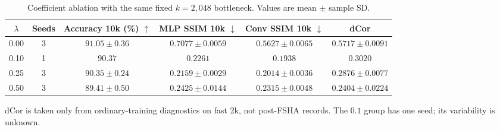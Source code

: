 \begin{table}[t]
\centering
\caption{Coefficient ablation with the same fixed $k=2{,}048$ bottleneck. Values are mean $\pm$ sample SD.}
\label{tab:ablation}
\footnotesize
\setlength{\tabcolsep}{4pt}
\begin{tabular}{@{}cccccc@{}}
\toprule
$\lambda$ & Seeds & Accuracy 10k (\%) $\uparrow$ & MLP SSIM 10k $\downarrow$ & Conv SSIM 10k $\downarrow$ & dCor \\
\midrule
0.00 & 3 & $91.05\pm 0.36$ & $0.7077\pm 0.0059$ & $0.5627\pm 0.0065$ & $0.5717\pm 0.0091$ \\
0.10 & 1 & $90.37$ & $0.2261$ & $0.1938$ & $0.3020$ \\
0.25 & 3 & $90.35\pm 0.24$ & $0.2159\pm 0.0029$ & $0.2014\pm 0.0036$ & $0.2876\pm 0.0077$ \\
0.50 & 3 & $89.41\pm 0.50$ & $0.2425\pm 0.0144$ & $0.2315\pm 0.0048$ & $0.2404\pm 0.0224$ \\
\bottomrule
\end{tabular}
\par\vspace{2pt}\begin{minipage}{\linewidth}\footnotesize dCor is taken only from ordinary-training diagnostics on fast 2k, not post-FSHA records. The $0.1$ group has one seed; its variability is unknown.\end{minipage}
\end{table}
